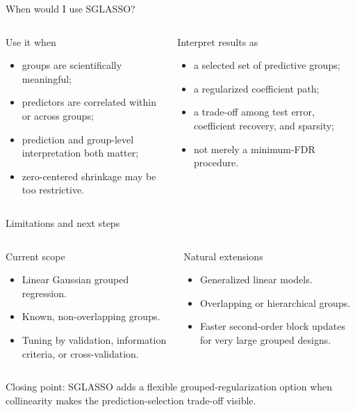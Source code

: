 \documentclass[newPxFont,nosectionpage]{beamer}
\begin{document}
\begin{frame}{When would I use SGLASSO?}
\small
\begin{columns}[T,onlytextwidth]
\begin{block}{Use it when}
\begin{itemize}
  \item groups are scientifically meaningful;
  \item predictors are correlated within or across groups;
  \item prediction and group-level interpretation both matter;
  \item zero-centered shrinkage may be too restrictive.
\end{itemize}
\end{block}
\begin{block}{Interpret results as}
\begin{itemize}
  \item a selected set of predictive groups;
  \item a regularized coefficient path;
  \item a trade-off among test error, coefficient recovery, and sparsity;
  \item not merely a minimum-FDR procedure.
\end{itemize}
\end{block}
\end{columns}
\end{frame}

\begin{frame}{Limitations and next steps}
\footnotesize
\begin{columns}[T,onlytextwidth]
\begin{block}{Current scope}
\begin{itemize}
  \item Linear Gaussian grouped regression.
  \item Known, non-overlapping groups.
  \item Tuning by validation, information criteria, or cross-validation.
\end{itemize}
\end{block}
\begin{block}{Natural extensions}
\begin{itemize}
  \item Generalized linear models.
  \item Overlapping or hierarchical groups.
  \item Faster second-order block updates for very large grouped designs.
\end{itemize}
\end{block}
\end{columns}
\vspace{0.25em}
\centering\scriptsize\color{sthlmBlue}
Closing point: SGLASSO adds a flexible grouped-regularization option when collinearity makes the prediction-selection trade-off visible.
\end{frame}
\end{document}
